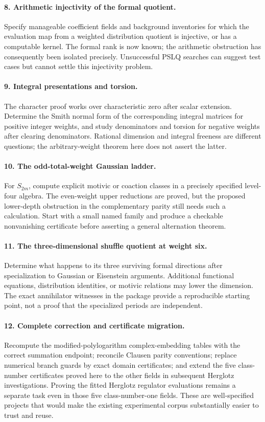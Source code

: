 \paragraph{8. Arithmetic injectivity of the formal quotient.}
Specify manageable coefficient fields and background inventories for
which the evaluation map from a weighted distribution quotient is
injective, or has a computable kernel.  The formal rank is now known;
the arithmetic obstruction has consequently been isolated precisely.
Unsuccessful PSLQ searches can suggest test cases but cannot settle
this injectivity problem.

\paragraph{9. Integral presentations and torsion.}
The character proof works over characteristic zero after scalar
extension.  Determine the Smith normal form of the corresponding
integral matrices for positive integer weights, and study denominators
and torsion for negative weights after clearing denominators.
Rational dimension and integral freeness are different questions;
the arbitrary-weight theorem here does not assert the latter.

\paragraph{10. The odd-total-weight Gaussian ladder.}
For $S_{2m}$, compute explicit motivic or coaction classes in a precisely
specified level-four algebra.  The even-weight upper reductions are
proved, but the proposed lower-depth obstruction in the complementary
parity still needs such a calculation.  Start with a small named family
and produce a checkable nonvanishing certificate before asserting a
general alternation theorem.

\paragraph{11. The three-dimensional shuffle quotient at weight six.}
Determine what happens to its three surviving formal directions after
specialization to Gaussian or Eisenstein arguments.  Additional
functional equations, distribution identities, or motivic relations
may lower the dimension.  The exact annihilator witnesses in the
package provide a reproducible starting point, not a proof that the
specialized periods are independent.

\paragraph{12. Complete correction and certificate migration.}
Recompute the modified-polylogarithm complex-embedding tables with the
correct summation endpoint; reconcile Clausen parity conventions;
replace numerical branch guards by exact domain certificates; and
extend the five class-number certificates proved here to the other
fields in subsequent Herglotz investigations. Proving the fitted
Herglotz regulator evaluations remains a separate task even in those
five class-number-one fields. These are well-specified projects
that would make the existing experimental corpus substantially easier
to trust and reuse.

